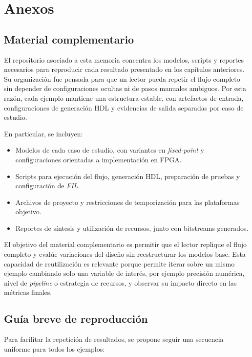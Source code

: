 \chapter{Anexos}

\section{Material complementario}
El repositorio asociado a esta memoria concentra los modelos, scripts y reportes necesarios para reproducir cada resultado presentado en los capítulos anteriores. Su organización fue pensada para que un lector pueda repetir el flujo completo sin depender de configuraciones ocultas ni de pasos manuales ambiguos. Por esta razón, cada ejemplo mantiene una estructura estable, con artefactos de entrada, configuraciones de generación HDL y evidencias de salida separadas por caso de estudio.

En particular, se incluyen:

\begin{itemize}
    \item Modelos de cada caso de estudio, con variantes en \textit{fixed-point} y configuraciones orientadas a implementación en FPGA.
    \item Scripts para ejecución del flujo, generación HDL, preparación de pruebas y configuración de \textit{FIL}.
    \item Archivos de proyecto y restricciones de temporización para las plataformas objetivo.
    \item Reportes de síntesis y utilización de recursos, junto con bitstreams generados.
\end{itemize}

El objetivo del material complementario es permitir que el lector replique el flujo completo y evalúe variaciones del diseño sin reestructurar los modelos base. Esta capacidad de reutilización es relevante porque permite iterar sobre un mismo ejemplo cambiando solo una variable de interés, por ejemplo precisión numérica, nivel de \textit{pipeline} o estrategia de recursos, y observar su impacto directo en las métricas finales.

\section{Guía breve de reproducción}
Para facilitar la repetición de resultados, se propone seguir una secuencia uniforme para todos los ejemplos:

